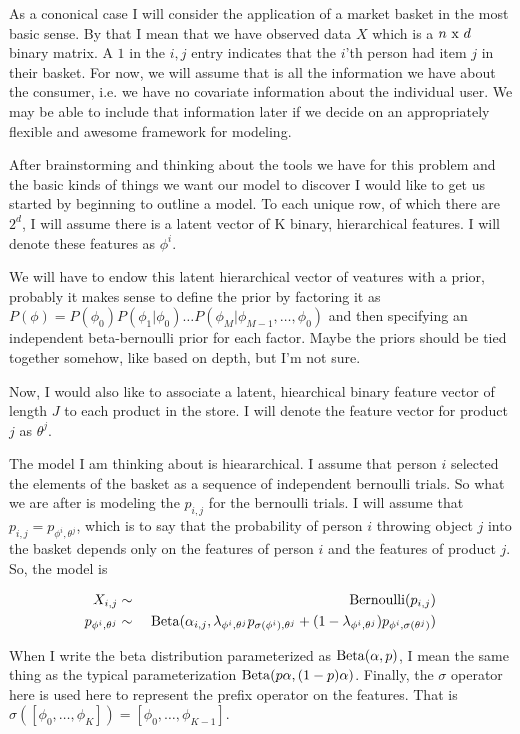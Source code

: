 \documentclass[11pt]{article}
\begin{document}
As a cononical case I will consider the application of a market basket in the most basic sense.  By that I mean that we have observed data $X$ which is a $n \ {\rm x } \ d$ binary matrix.  A $1$ in the $i,j$ entry indicates that the $i$'th person had item $j$ in their basket.  For now, we will assume that is all the information we have about the consumer, i.e. we have no covariate information about the individual user.  We may be able to include that information later if we decide on an appropriately flexible and awesome framework for modeling.  

After brainstorming and thinking about the tools we have for this problem and the basic kinds of things we want our model to discover I would like to get us started by beginning to outline a model.  To each unique row, of which there are $2^d$, I will assume there is a latent vector of K binary, hierarchical features.  I will denote these features as $\phi^i$.

We will have to endow this latent hierarchical vector of veatures with a prior, probably it makes sense to define the prior by factoring it as $P(\phi) = P(\phi_0)P(\phi_1 | \phi_0) \ldots P(\phi_M| \phi_{M-1}, \ldots, \phi_0)$ and then specifying an independent beta-bernoulli prior for each factor.  Maybe the priors should be tied together somehow, like based on depth, but I'm not sure. 

Now, I would also like to associate a latent, hiearchical binary feature vector of length $J$ to each product in the store.  I will denote the feature vector for product $j$ as $\theta^j$.

The model I am thinking about is hieararchical.  I assume that person $i$ selected the elements of the basket as a sequence of independent bernoulli trials.  So what we are after is modeling the $p_{i,j}$ for the bernoulli trials.  I will assume that $p_{i,j} = p_{\phi^i, \theta^j}$, which is to say that the probability of person $i$ throwing object $j$ into the basket depends only on the features of person $i$ and the features of product $j$.  So, the model is

\begin{eqnarray*}
  X_{i,j} &\sim& \ {\rm Bernoulli}(p_{i,j})\\
  p_{\phi^i,\theta^j} &\sim& \ {\rm Beta}(\alpha_{i,j}, \lambda_{\phi^i,\theta^j} p_{\sigma(\phi^i),\theta^j} + (1 - \lambda_{\phi^i, \theta^j})p_{\phi^i,\sigma(\theta^j)})
\end{eqnarray*}

When I write the beta distribution parameterized as ${\rm Beta}(\alpha, p)$, I mean the same thing as the typical parameterization ${\rm Beta}(p\alpha, (1-p)\alpha)$.  Finally, the $\sigma$ operator here is used here to represent the prefix operator on the features.  That is $\sigma([\phi_0, \ldots, \phi_{K}]) = [\phi_0, \ldots, \phi_{K-1}]$.
\end{document}
